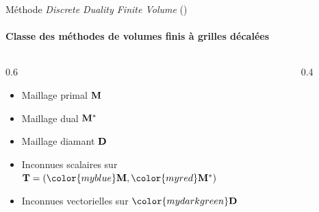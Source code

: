 \begin{frame}{Méthode \emph{Discrete Duality Finite Volume} (\ddfv)}
\framesubtitle{Classe des méthodes de volumes finis à \textbf{grilles décalées}}

\begin{columns}[c]
\begin{column}{0.6\textwidth}
\begin{itemize}
    \item<1-> {\color{myblue} Maillage primal $\mathbf{M}$}
    \item<2-> {\color{myred} Maillage dual ${\mathbf{M}^\ast}$}
    \item<3-> {\color{mydarkgreen} Maillage diamant $\mathbf{D}$}
\end{itemize}
\medskip
\begin{itemize}
    \item<2-> Inconnues scalaires sur $\ensddfvplat = ({\color{myblue}\ensprimalplat}, {\color{myred}\ensdualplat})$
    \item<3-> Inconnues vectorielles sur ${\color{mydarkgreen}\ensdiamantplat}$
\end{itemize}
\end{column}
\begin{column}{0.4\textwidth}
\begin{figure}
    \centering
    
\end{figure}
\end{column}
\end{columns}
\bigskip
{}
\end{frame}

